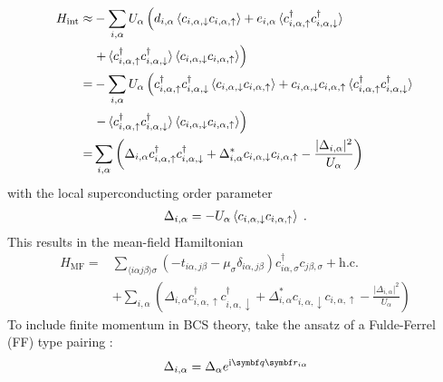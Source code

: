 \documentclass[../notes.tex]{subfiles}
\begin{document}
\begin{align}
	H_{\mathrm{int}} \approx &-\sum_{i, \alpha} U_{\alpha} \left(
	d_{i, \alpha} \braket{c_{i, \alpha, \downarrow} c_{i, \alpha, \uparrow}}
	+ e_{i, \alpha} \braket{c_{i, \alpha, \uparrow}^{\dagger} c_{i, \alpha, \downarrow}^{\dagger}} \right. \nonumber \\
	&\left.+ \braket{c_{i, \alpha, \uparrow}^{\dagger} c_{i, \alpha, \downarrow}^{\dagger}} \braket{c_{i, \alpha, \downarrow} c_{i, \alpha, \uparrow}}
	\right) \\
	= &-\sum_{i, \alpha} U_{\alpha} \left(
		c_{i, \alpha, \uparrow}^{\dagger} c_{i, \alpha, \downarrow}^{\dagger} \braket{c_{i, \alpha, \downarrow} c_{i, \alpha, \uparrow}}
		+ c_{i, \alpha, \downarrow} c_{i, \alpha, \uparrow} \braket{c_{i, \alpha, \uparrow}^{\dagger} c_{i, \alpha, \downarrow}^{\dagger}} \right. \nonumber \\
	&\left.- \braket{c_{i, \alpha, \uparrow}^{\dagger} c_{i, \alpha, \downarrow}^{\dagger}} \braket{c_{i, \alpha, \downarrow} c_{i, \alpha, \uparrow}} \right) \\
	= &\sum_{i, \alpha} \left(\Delta_{i, \alpha} c_{i, \alpha, \uparrow}^{\dagger} c_{i, \alpha, \downarrow}^{\dagger} + \Delta_{i, \alpha}^{*} c_{i, \alpha, \downarrow} c_{i, \alpha, \uparrow} - \frac{\vert \Delta_{i, \alpha} \vert^2}{U_{\alpha}}\right)
\end{align}
with the local superconducting order parameter
\begin{align}
	\Delta_{i, \alpha} = -U_{\alpha} \braket{c_{i, \alpha, \downarrow} c_{i, \alpha, \uparrow}} \;.
\end{align}
This results in the mean-field Hamiltonian
\begin{align}
	H_{\mathrm{MF}} = &\sum_{\langle i \alpha j \beta \rangle \sigma} \left(-t_{i \alpha, j \beta} - \mu_{\sigma} \delta_{i \alpha, j \beta}\right) c_{i \alpha, \sigma}^{\dagger} c_{j \beta, \sigma} + \mathrm{h.c.} \nonumber \\
	&+ \sum_{i, \alpha} \left(\Delta_{i, \alpha} c_{i, \alpha, \uparrow}^{\dagger} c_{i, \alpha, \downarrow}^{\dagger} + \Delta_{i, \alpha}^{*} c_{i, \alpha, \downarrow} c_{i, \alpha, \uparrow} - \frac{\vert \Delta_{i, \alpha} \vert^2}{U_{\alpha}}\right)
\end{align}
To include finite momentum in BCS theory, take the ansatz of a Fulde-Ferrel (FF) type pairing \cite{kinnunenFuldeFerrellLarkin2018}:
\begin{equation}
	\Delta_{i, \alpha} = \Delta_{\alpha} e^{\iu \vb{q} \vb{r}_{i \alpha}}
\end{equation}
\end{document}
